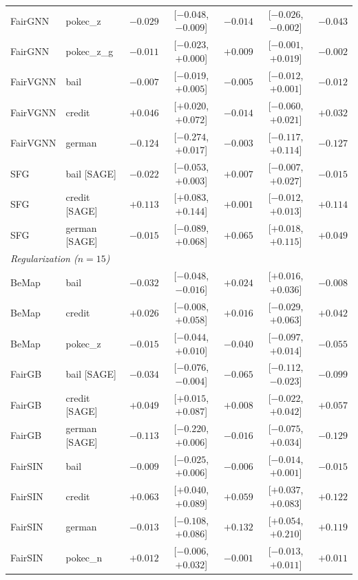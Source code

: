 \begin{table}[t]
\begin{tabular}{llrcrcr}
FairGNN & pokec\_z & $-0.029$ & [$-0.048$, $-0.009$] & $-0.014$ & [$-0.026$, $-0.002$] & $-0.043$ \\
FairGNN & pokec\_z\_g & $-0.011$ & [$-0.023$, $+0.000$] & $+0.009$ & [$-0.001$, $+0.019$] & $-0.002$ \\
\midrule
FairVGNN & bail & $-0.007$ & [$-0.019$, $+0.005$] & $-0.005$ & [$-0.012$, $+0.001$] & $-0.012$ \\
FairVGNN & credit & $+0.046$ & [$+0.020$, $+0.072$] & $-0.014$ & [$-0.060$, $+0.021$] & $+0.032$ \\
FairVGNN & german & $-0.124$ & [$-0.274$, $+0.017$] & $-0.003$ & [$-0.117$, $+0.114$] & $-0.127$ \\
\midrule
SFG & bail [SAGE] & $-0.022$ & [$-0.053$, $+0.003$] & $+0.007$ & [$-0.007$, $+0.027$] & $-0.015$ \\
SFG & credit [SAGE] & $+0.113$ & [$+0.083$, $+0.144$] & $+0.001$ & [$-0.012$, $+0.013$] & $+0.114$ \\
SFG & german [SAGE] & $-0.015$ & [$-0.089$, $+0.068$] & $+0.065$ & [$+0.018$, $+0.115$] & $+0.049$ \\
\midrule
\multicolumn{7}{l}{\textit{Regularization ($n=15$)}} \\
BeMap & bail & $-0.032$ & [$-0.048$, $-0.016$] & $\mathbf{+0.024}$ & [$+0.016$, $+0.036$] & $-0.008$ \\
BeMap & credit & $+0.026$ & [$-0.008$, $+0.058$] & $+0.016$ & [$-0.029$, $+0.063$] & $+0.042$ \\
BeMap & pokec\_z & $-0.015$ & [$-0.044$, $+0.010$] & $-0.040$ & [$-0.097$, $+0.014$] & $-0.055$ \\
\midrule
FairGB & bail [SAGE] & $-0.034$ & [$-0.076$, $-0.004$] & $\mathbf{-0.065}$ & [$-0.112$, $-0.023$] & $-0.099$ \\
FairGB & credit [SAGE] & $+0.049$ & [$+0.015$, $+0.087$] & $+0.008$ & [$-0.022$, $+0.042$] & $+0.057$ \\
FairGB & german [SAGE] & $-0.113$ & [$-0.220$, $+0.006$] & $-0.016$ & [$-0.075$, $+0.034$] & $-0.129$ \\
\midrule
FairSIN & bail & $-0.009$ & [$-0.025$, $+0.006$] & $-0.006$ & [$-0.014$, $+0.001$] & $-0.015$ \\
FairSIN & credit & $+0.063$ & [$+0.040$, $+0.089$] & $\mathbf{+0.059}$ & [$+0.037$, $+0.083$] & $+0.122$ \\
FairSIN & german & $-0.013$ & [$-0.108$, $+0.086$] & $\mathbf{+0.132}$ & [$+0.054$, $+0.210$] & $+0.119$ \\
FairSIN & pokec\_n & $+0.012$ & [$-0.006$, $+0.032$] & $-0.001$ & [$-0.013$, $+0.011$] & $+0.011$ \\

\end{tabular}
\end{table}
